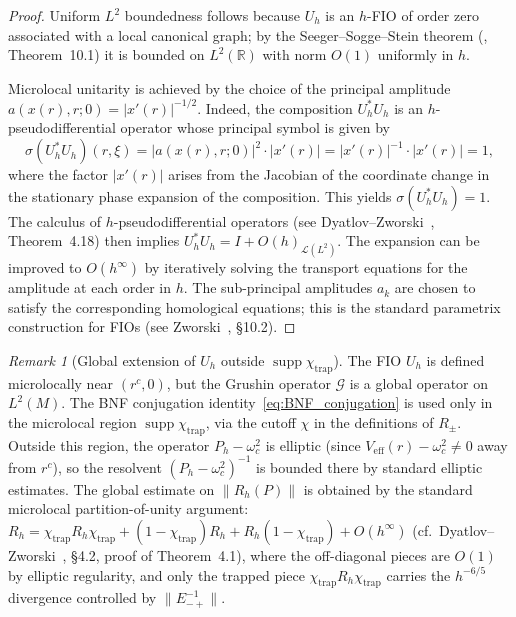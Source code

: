 \documentclass[12pt,a4paper]{amsart}
\theoremstyle{remark}
\newtheorem{remark}[theorem]{Remark}
\begin{document}
\begin{proof}
Uniform $L^2$ boundedness follows because $U_h$ is an $h$-FIO of order
zero associated with a local canonical graph; by the Seeger--Sogge--Stein
theorem (\cite{Zworski2012}, Theorem~10.1) it is bounded on
$L^2(\mathbb{R})$ with norm $O(1)$ uniformly in $h$.

Microlocal unitarity is achieved by the choice of the principal amplitude
$a(x(r),r;0) = |x'(r)|^{-1/2}$.
Indeed, the composition $U_h^* U_h$ is an $h$-pseudodifferential operator
whose principal symbol is given by
\[
  \sigma(U_h^* U_h)(r,\xi)
  = |a(x(r),r;0)|^2 \cdot |x'(r)|
  = |x'(r)|^{-1} \cdot |x'(r)|
  = 1,
\]
where the factor $|x'(r)|$ arises from the Jacobian of the coordinate change in
the stationary phase expansion of the composition.
This yields $\sigma(U_h^* U_h) = 1$. The calculus of $h$-pseudodifferential operators
(see Dyatlov--Zworski~\cite{DZ19}, Theorem~4.18) then implies
$U_h^* U_h = I + O(h)_{\mathcal{L}(L^2)}$.
The expansion can be improved to $O(h^\infty)$ by iteratively solving the transport
equations for the amplitude at each order in $h$. The sub-principal amplitudes $a_k$
are chosen to satisfy the corresponding homological equations; this is the standard
parametrix construction for FIOs (see Zworski~\cite{Zworski2012}, \S10.2).
\end{proof}

\begin{remark}[Global extension of $U_h$ outside $\operatorname{supp}\chi_{\mathrm{trap}}$]
\label{rem:FIO_global}
The FIO $U_h$ is defined microlocally near $(r^c, 0)$, but the Grushin
operator $\mathcal{G}$ is a global operator on $L^2(M)$.
The BNF conjugation identity~\eqref{eq:BNF_conjugation} is used only
in the microlocal region $\operatorname{supp}\chi_{\mathrm{trap}}$, via the
cutoff $\chi$ in the definitions of $R_\pm$.
Outside this region, the operator $P_h - \omega_c^2$ is elliptic
(since $V_\mathrm{eff}(r) - \omega_c^2 \neq 0$ away from $r^c$),
so the resolvent $(P_h - \omega_c^2)^{-1}$ is bounded there by
standard elliptic estimates.
The global estimate on $\|R_h(P)\|$ is obtained by the standard
microlocal partition-of-unity argument:
$R_h = \chi_{\mathrm{trap}} R_h \chi_{\mathrm{trap}} +
(1-\chi_{\mathrm{trap}})R_h + R_h(1-\chi_{\mathrm{trap}}) +
O(h^\infty)$
(cf.\ Dyatlov--Zworski~\cite{DZ19}, \S4.2, proof of Theorem~4.1),
where the off-diagonal pieces are $O(1)$ by elliptic regularity, and
only the trapped piece $\chi_{\mathrm{trap}} R_h \chi_{\mathrm{trap}}$
carries the $h^{-6/5}$ divergence controlled by $\|E_{-+}^{-1}\|$.
\end{remark}
\end{document}
